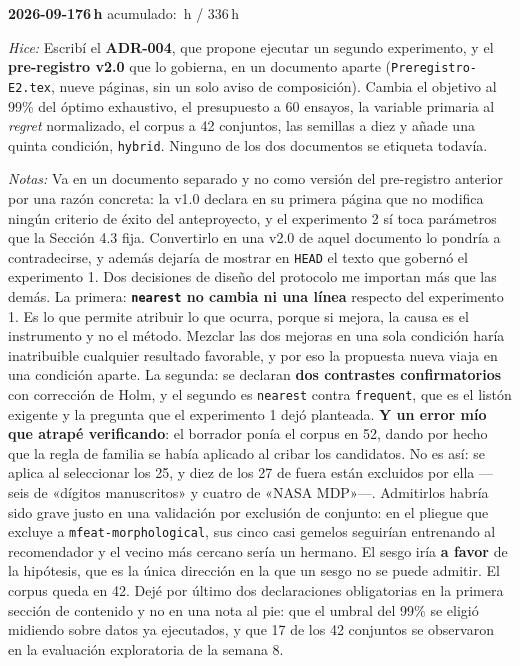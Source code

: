 \documentclass[11pt,letterpaper]{article}
\newcommand{\presupuesto}{336}
\newcommand{\horasacum}{0}
\newcommand{\entrada}[4]{%
  \xdef\horasacum{\fpeval{\horasacum + #2}}%
  \par\medskip
  \noindent\textbf{\color{tecnavy}#1}\quad\textbf{#2\,h}%
  \hfill{\small\color{gris}acumulado: \horasacum\,h / \presupuesto\,h}\par
  \nopagebreak
  \noindent\textit{Hice:} #3\par
  \nopagebreak
  \noindent\textit{Notas:} #4\par
}
\begin{document}
\entrada{2026-09-17}{6}
{Escribí el \textbf{ADR-004}, que propone ejecutar un segundo experimento, y el
 \textbf{pre-registro v2.0} que lo gobierna, en un documento aparte
 (\texttt{Preregistro-E2.tex}, nueve páginas, sin un solo aviso de composición). Cambia el
 objetivo al 99\% del óptimo exhaustivo, el presupuesto a 60 ensayos, la variable primaria
 al \emph{regret} normalizado, el corpus a 42 conjuntos, las semillas a diez y añade una
 quinta condición, \texttt{hybrid}. Ninguno de los dos documentos se etiqueta todavía.}
{Va en un documento separado y no como versión del pre-registro anterior por una razón
 concreta: la v1.0 declara en su primera página que no modifica ningún criterio de éxito del
 anteproyecto, y el experimento 2 sí toca parámetros que la Sección 4.3 fija. Convertirlo en
 una v2.0 de aquel documento lo pondría a contradecirse, y además dejaría de mostrar en
 \texttt{HEAD} el texto que gobernó el experimento 1. Dos decisiones de diseño del protocolo
 me importan más que las demás. La primera: \textbf{\texttt{nearest} no cambia ni una línea}
 respecto del experimento 1. Es lo que permite atribuir lo que ocurra, porque si mejora,
 la causa es el instrumento y no el método. Mezclar las dos mejoras en una sola condición
 haría inatribuible cualquier resultado favorable, y por eso la propuesta nueva viaja en una
 condición aparte. La segunda: se declaran \textbf{dos contrastes confirmatorios} con
 corrección de Holm, y el segundo es \texttt{nearest} contra \texttt{frequent}, que es el
 listón exigente y la pregunta que el experimento 1 dejó planteada. \textbf{Y un error mío
 que atrapé verificando}: el borrador ponía el corpus en 52, dando por hecho que la regla de
 familia se había aplicado al cribar los candidatos. No es así: se aplica al seleccionar los
 25, y diez de los 27 de fuera están excluidos por ella —seis de «dígitos manuscritos» y
 cuatro de «NASA MDP»—. Admitirlos habría sido grave justo en una validación por exclusión
 de conjunto: en el pliegue que excluye a \texttt{mfeat-morphological}, sus cinco casi
 gemelos seguirían entrenando al recomendador y el vecino más cercano sería un hermano. El
 sesgo iría \textbf{a favor} de la hipótesis, que es la única dirección en la que un sesgo no
 se puede admitir. El corpus queda en 42. Dejé por último dos declaraciones obligatorias en
 la primera sección de contenido y no en una nota al pie: que el umbral del 99\% se eligió
 midiendo sobre datos ya ejecutados, y que 17 de los 42 conjuntos se observaron en la
 evaluación exploratoria de la semana 8.}
\end{document}
